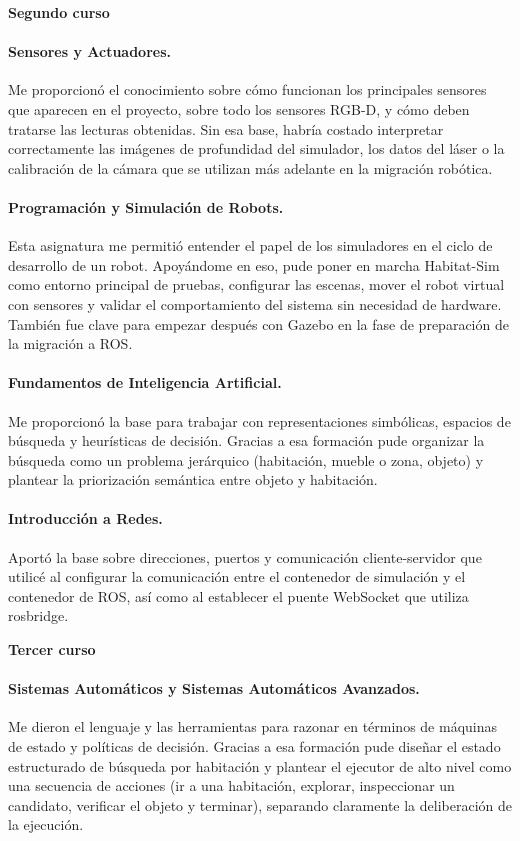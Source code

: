 \documentclass[11pt,fleqn,openany]{book} %
\newcommand{\cursoTitulo}[1]{%
  \par\addvspace{14pt}%
  {\sffamily\bfseries\large\color{ocre}#1}%
  \par\vspace{1pt}%
  \noindent{\color{ocre!60}\rule{\linewidth}{0.4pt}}%
  \par\addvspace{4pt}%
}
\begin{document}
\cursoTitulo{Segundo curso}

\paragraph{Sensores y Actuadores.} Me proporcionó el conocimiento sobre cómo funcionan los principales sensores que aparecen en el proyecto, sobre todo los sensores RGB-D, y cómo deben tratarse las lecturas obtenidas. Sin esa base, habría costado interpretar correctamente las imágenes de profundidad del simulador, los datos del láser o la calibración de la cámara que se utilizan más adelante en la migración robótica.

\paragraph{Programación y Simulación de Robots.} Esta asignatura me permitió entender el papel de los simuladores en el ciclo de desarrollo de un robot. Apoyándome en eso, pude poner en marcha Habitat-Sim como entorno principal de pruebas, configurar las escenas, mover el robot virtual con sensores y validar el comportamiento del sistema sin necesidad de hardware. También fue clave para empezar después con Gazebo en la fase de preparación de la migración a ROS.

\paragraph{Fundamentos de Inteligencia Artificial.} Me proporcionó la base para trabajar con representaciones simbólicas, espacios de búsqueda y heurísticas de decisión. Gracias a esa formación pude organizar la búsqueda como un problema jerárquico (habitación, mueble o zona, objeto) y plantear la priorización semántica entre objeto y habitación.

\paragraph{Introducción a Redes.} Aportó la base sobre direcciones, puertos y comunicación cliente-servidor que utilicé al configurar la comunicación entre el contenedor de simulación y el contenedor de ROS, así como al establecer el puente WebSocket que utiliza rosbridge.

\cursoTitulo{Tercer curso}

\paragraph{Sistemas Automáticos y Sistemas Automáticos Avanzados.} Me dieron el lenguaje y las herramientas para razonar en términos de máquinas de estado y políticas de decisión. Gracias a esa formación pude diseñar el estado estructurado de búsqueda por habitación y plantear el ejecutor de alto nivel como una secuencia de acciones (ir a una habitación, explorar, inspeccionar un candidato, verificar el objeto y terminar), separando claramente la deliberación de la ejecución.
\end{document}
